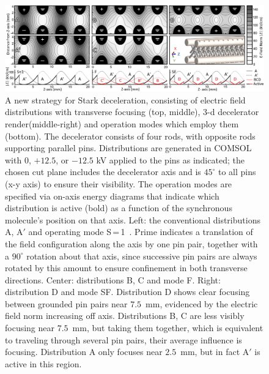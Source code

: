 \documentclass[%
 reprint,
 amsmath,amssymb,
 aps,
prl,
]{revtex4-1}
\begin{document}
\begin{figure}[t!]
\includegraphics[width=\linewidth]{fig1.png}%
\vspace{-2mm}
\caption{
A new strategy for Stark deceleration, consisting of electric field distributions with transverse focusing (top, middle), 3-d decelerator render(middle-right) and operation modes which employ them (bottom). 
The decelerator consists of four rods, with opposite rods supporting parallel pins.
Distributions are generated in COMSOL with $0$, $+12.5$, or $-12.5$ kV applied to the pins as indicated; the chosen cut plane includes the decelerator axis and is $45^\circ$ to all pins (x-y axis) to ensure their visibility.
The operation modes are specified via on-axis energy diagrams that indicate which distribution is active (bold) as a function of the synchronous molecule's position on that axis.
Left: the conventional distributions A, A$'$ and operating mode S\,=\,1~\cite{VanDeMeerakker2005a}.
Prime indicates a translation of the field configuration along the axis by one pin pair, together with a $90^\circ$ rotation about that axis, since successive pin pairs are always rotated by this amount to ensure confinement in both transverse directions.
Center: distributions B, C and mode F.
Right: distribution D and mode SF.
Distribution D shows clear focusing between grounded pin pairs near $7.5$~mm, evidenced by the electric field norm increasing off axis.
Distributions B, C are less visibly focusing near $7.5$~mm, but taking them together, which is equivalent to traveling through several pin pairs, their average influence is focusing.
Distribution A only focuses near $2.5$~mm, but in fact A$'$ is active in this region.
\vspace{-4mm}
}
\label{fig:chargecartoon}
\end{figure}
\end{document}

